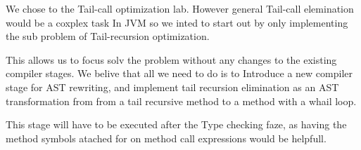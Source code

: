We chose to the Tail-call optimization lab. However general Tail-call elemination would be a coxplex task In JVM so we inted to start out by only implementing the sub problem of Tail-recursion optimization.

This allows us to focus solv the problem without any changes to the existing compiler stages. We belive that all we need to do is to Introduce a new compiler stage for AST rewriting, and implement tail recursion elimination as an AST transformation from from a tail recursive method to a method with a whail loop.

This stage will have to be executed after the Type checking faze, as having the method symbols atached for on method call expressions would be helpfull.
